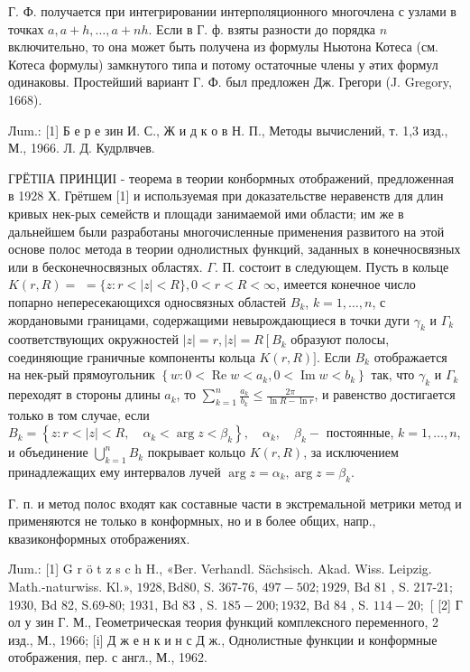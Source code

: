 \documentclass[10pt]{article}
\begin{document}
Г. Ф. получается при интегрировании интерполяционного многочлена с узлами в точках $a, a+h, \ldots, a+n h$. Если в Г. ф. взяты разности до порядка $n$ включительно, то она может быть получена из формулы Ньютона Котеса (см. Котеса формулы) замкнутого типа и потому остаточные члены у әтих формул одинаковы. Простейший вариант Г. Ф. был предложен Дж. Грегори (J. Gregory, 1668).



Лum.: [1] Б е р е зин И. С., Ж и д к о в Н. П., Методы вычислений, т. 1,3 изд., М., 1966. Л. Д. Кудрлвчев.



ГРЁТІІА ПРИНЦИІ - теорема в теории конбормных отображений, предложенная в 1928 Х. Грётшем [1] и используемая при доказательстве неравенств для длин кривых нек-рых семейств и площади занимаемой ими области; им же в дальнейшем были разработаны многочисленные применения развитого на этой основе полос метода в теории однолистных функций, заданных в конечносвязных или в бесконечносвязных областях. $\Gamma$. П. состоит в следующем. Пусть в кольце $K(r, R)=$ $=\{z: r<|z|<R\}, 0<r<R<\infty$, имеется конечное число попарно непересекающихся односвязных областей $B_{k}$, $k=1, \ldots, n$, с жордановыми границами, содержащими невырождающиеся в точки дуги $\gamma_{k}$ и $\Gamma_{k}$ соответствующих окружностей $|z|=r,|z|=R\left[B_{k}\right.$ образуют полосы, соединяющие граничные компоненты кольца $K(r, R)]$. Если $B_{k}$ отображается на нек-рый прямоугольник $\left\{w: 0<\operatorname{Re} w<a_{k}, 0<\operatorname{Im} w<b_{k}\right\}$ так, что $\gamma_{k}$ и $\Gamma_{k}$ переходят в стороны длины $a_{k}$, то $\sum_{k=1}^{n} \frac{a_{k}}{b_{k}} \leqslant \frac{2 \pi}{\ln R-\ln r}$, и равенство достигается только в том случае, если $B_{k}=\left\{z: r<|z|<R, \quad \alpha_{k}<\arg z<\beta_{k}\right\}, \quad \alpha_{k}, \quad \beta_{k}-$ постоянные, $k=1, \ldots, n$, и объединение $\bigcup_{k=1}^{n} B_{k}$ покрывает кольцо $K(r, R)$, за исключением принадлежащих ему интервалов лучей $\arg z=\alpha_{k}, \arg z=\beta_{k}$.



Г. п. и метод полос входят как составные части в экстремальной метрики метод и применяются не только в конформных, но и в более общих, напр., квазиконформных отображениях.



Лum.: [1] G r ö t z s c h H., «Ber. Verhandl. Sächsisch. Akad. Wiss. Leipzig. Math.-naturwiss. Kl.», $1928, \mathrm{Bd} 80$, S. 367-76, $497-502 ; 1929$, Bd 81 , S. 217-21; 1930, Bd 82, S.69-80; 1931, Bd 83 , S. $185-200 ; 1932$, Bd 84 , S. $114-20 ;$ [ [2] Г ол у зин Г. М., Геометрическая теория функций комплексного переменного, 2 изд., М., 1966; [i] Д ж е н к и н с Д ж., Однолистные функции и конформные отображения, пер. с англ., М., 1962.
\end{document}
